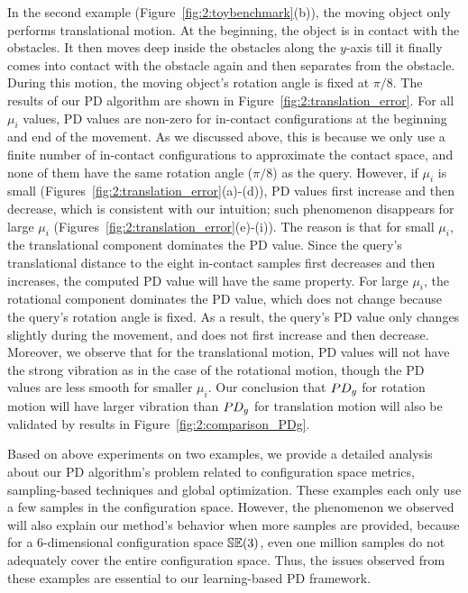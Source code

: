 In the second example (Figure~\ref{fig:2:toybenchmark}(b)), the moving object only performs translational motion. At the beginning, the object is in contact with the obstacles. It then moves deep inside the obstacles along the $y$-axis till it finally comes into contact with the obstacle again and then separates from the obstacle. During this motion, the moving object's rotation angle is fixed at $\pi/8$. The results of our PD algorithm are shown in Figure~\ref{fig:2:translation_error}. For all $\mu_i$ values, PD values are non-zero for in-contact configurations at the beginning and end of the movement. As we discussed above, this is because we only use a finite number of in-contact configurations to approximate the contact space, and none of them have the same rotation angle ($\pi/8$) as the query. However, if $\mu_i$ is small (Figures~\ref{fig:2:translation_error}(a)-(d)), PD values first increase and then decrease, which is consistent with our intuition; such phenomenon disappears for large $\mu_i$ (Figures~\ref{fig:2:translation_error}(e)-(i)). The reason is that for small $\mu_i$, the translational component dominates the PD value. Since the query's translational distance to the eight in-contact samples first decreases and then increases, the computed PD value will have the same property. For large $\mu_i$, the rotational component dominates the PD value, which does not change because the query's rotation angle is fixed. As a result, the query's PD value only changes slightly during the movement, and does not first increase and then decrease.  Moreover, we observe that for the translational motion, PD values will not have the strong vibration as in the case of the rotational motion, though the PD values are less smooth for smaller $\mu_i$. Our conclusion that $PD_g$ for rotation motion will have larger vibration than $PD_g$ for translation motion will also be validated by results in Figure~\ref{fig:2:comparison_PDg}.

Based on above experiments on two examples, we provide a detailed analysis about our PD algorithm's problem related to configuration space metrics, sampling-based techniques and global optimization. These examples each only use a few samples in the configuration space. However, the phenomenon we observed will also explain our method's behavior when more samples are provided, because for a $6$-dimensional configuration space $\mathbb {SE}(3)$, even one million samples do not adequately cover the entire configuration space. Thus, the issues observed from these examples are essential to our learning-based PD framework.


